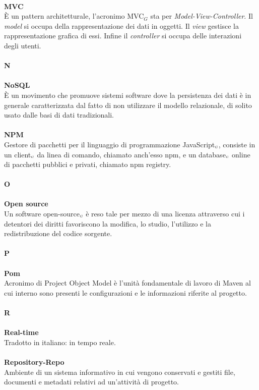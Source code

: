 \\
\textbf{MVC}\\
È un pattern architetturale, l'acronimo MVC$_G$ sta per \textit{Model-View-Controller}.
Il \textit{model} si occupa della rappresentazione dei dati in oggetti.
Il \textit{view} gestisce la rappresentazione grafica di essi.
Infine il \textit{controller} si occupa delle interazioni degli utenti.\\
\\
\textbf{N}\\
\\
\textbf{NoSQL}\\
 È un movimento che promuove sistemi software dove la persistenza dei dati è in generale caratterizzata dal fatto di non utilizzare il modello relazionale, di solito usato dalle basi di dati tradizionali.\\
\\
\textbf{NPM}\\
Gestore di pacchetti per il linguaggio di programmazione JavaScript$_{\scaleto{G}{3pt}}$, consiste in un client$_{\scaleto{G}{3pt}}$ da linea di comando, chiamato anch'esso npm, e un database$_{\scaleto{G}{3pt}}$ online di pacchetti pubblici e privati, chiamato npm registry.\\
\\
\textbf{O}\\
\\
\textbf{Open source}\\
Un software open-source$_{\scaleto{G}{3pt}}$ è reso tale per mezzo di una licenza attraverso cui i detentori dei diritti favoriscono la modifica, lo studio, l'utilizzo e la redistribuzione del codice sorgente.\\
\\
\textbf{P}\\
\\
\textbf{Pom}\\
Acronimo di Project Object Model è l'unità fondamentale di lavoro di Maven al cui interno sono presenti le configurazioni e le informazioni riferite al progetto.\\
\\
\textbf{R}\\
\\
\textbf{Real-time}\\
Tradotto in italiano: in tempo reale.\\
\\
\textbf{Repository-Repo}\\
Ambiente di un sistema informativo in cui vengono conservati e gestiti file, documenti e metadati relativi ad un’attività di progetto.\\
